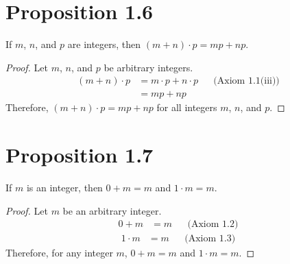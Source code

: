 \section*{Proposition 1.6}
If $m$, $n$, and $p$ are integers, then $(m+n) \cdot p = mp+np$.
\begin{proof}
    Let $m$, $n$, and $p$ be arbitrary integers.
    \begin{align*}
        (m + n) \cdot p & = m \cdot p + n \cdot p &  & \text{(Axiom 1.1(iii))} \\
                        & = mp + np
    \end{align*}
    Therefore, $(m + n) \cdot p = mp + np$ for all integers $m$, $n$, and $p$.
\end{proof}


\section*{Proposition 1.7}
If $m$ is an integer, then $0+m = m$ and $1 \cdot m = m$.
\begin{proof}
    Let $m$ be an arbitrary integer.
    \begin{align*}
        0 + m & = m &  & \text{(Axiom 1.2)}
    \end{align*}
    \begin{align*}
        1 \cdot m & = m &  & \text{(Axiom 1.3)}
    \end{align*}
    Therefore, for any integer $m$, $0 + m = m$ and $1 \cdot m = m$.
\end{proof}

